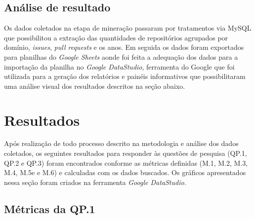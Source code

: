 \documentclass[12pt]{article}
\begin{document}
\subsection{Análise de resultado} 

Os dados coletados na etapa de mineração passaram por tratamentos via MySQL que possibilitou a extração das quantidades de repositórios agrupados por domínio, \textit{issues}, \textit{pull requests} e os anos. Em seguida os dados foram exportados para planilhas do \emph{Google Sheets} aonde foi feita a adequação dos dados para a importação da planilha no \emph{Google DataStudio}, ferramenta do Google que foi utilizada para a geração dos relatórios e painéis informativos que possibilitaram uma análise visual dos resultados descritos na seção abaixo.

\section{Resultados} \label{resultados}

Após realização de todo processo descrito na metodologia e análise dos dados coletados, os seguintes resultados para responder às questões de pesquisa (QP.1, QP.2 e QP.3) foram encontrados conforme as métricas definidas (M.1, M.2, M.3, M.4, M.5e e M.6) e calculadas com os dados buscados. Os gráficos apresentados nessa seção foram criados na ferramenta \emph{Google DataStudio}.

\subsection{Métricas da QP.1}
\end{document}

